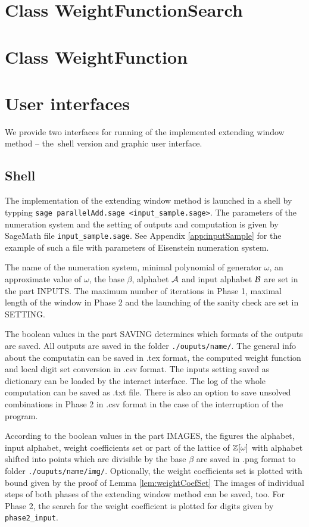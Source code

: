 \section{Class WeightFunctionSearch}



\section{Class WeightFunction}


\section{User interfaces}
We provide two interfaces for running of the implemented extending window method -- the~shell version and graphic user interface.

\subsection{Shell}
The implementation of the extending window method is launched in a shell by typping \verb+sage parallelAdd.sage <input_sample.sage>+. The parameters of the numeration system and the setting of outputs and computation is given by SageMath file \verb+input_sample.sage+. See Appendix \ref{app:inputSample} for the example of such a file with parameters of Eisenstein numeration system.

The name of the numeration system, minimal polynomial of generator $\omega$, an approximate value of $\omega$, the base $\beta$, alphabet $\mathcal{A}$ and input alphabet $\mathcal{B}$ are set in the part INPUTS. The maximum number of iterations in Phase 1, maximal length of the window in Phase 2 and the launching of the sanity check are set in SETTING. 

The boolean values in the part SAVING determines which formats of the outputs are saved. All outputs are saved in the folder \verb+./ouputs/name/+. The general info about the computatin can be saved in .tex format, the computed weight function and local digit set conversion in .csv format. The inputs setting saved as dictionary can be loaded by the interact interface. The log of the whole computation can be saved as .txt file. There is also an option to save unsolved combinations in Phase 2 in .csv format in the case of the interruption of the program.

According to the boolean values in the part IMAGES, the figures the alphabet, input alphabet, weight coefficients set or part of the lattice of $\mathbb{Z}[\omega]$ with alphabet shifted into points which are divisible by the base $\beta$ are saved in .png format to folder \verb+./ouputs/name/img/+. Optionally, the weight coefficients set is plotted with bound given by the proof of Lemma \ref{lem:weightCoefSet} The images of individual steps of both phases of the extending window method can be saved, too. For Phase 2, the search for the weight coefficient  is plotted for digits given by \verb+phase2_input+.  

